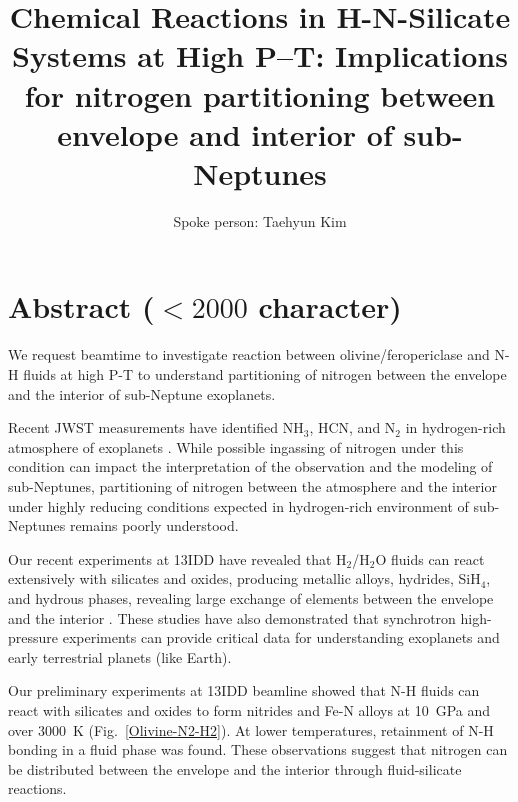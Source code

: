 
\title{Chemical Reactions in H-N-Silicate Systems at High P--T: Implications for nitrogen partitioning between envelope and interior of sub-Neptunes}
\author{Spoke person: Taehyun Kim}
\maketitle

\section{Abstract ($<2000$ character)}



We request beamtime to investigate reaction between olivine/feropericlase and N-H fluids at high P-T to understand partitioning of nitrogen between the envelope and the interior of sub-Neptune exoplanets. 

Recent JWST measurements have identified NH$_3$, HCN, and N$_2$ in hydrogen-rich atmosphere of exoplanets \cite{heng_ANALYTICAL_2016, bean_Nature_2021, radecka_Nitrogen_2025}. 
While possible ingassing of nitrogen under this condition can impact the interpretation of the observation and the modeling of sub-Neptunes, partitioning of nitrogen between the atmosphere and the interior under highly reducing conditions expected in hydrogen-rich environment of sub-Neptunes remains poorly understood. 

Our recent experiments at 13IDD have revealed that H$_2$/H$_2$O fluids can react extensively with silicates and oxides, producing metallic alloys, hydrides, SiH$_4$, and hydrous phases, revealing large exchange of elements between the envelope and the interior \cite{nisr_Large_2020, kim_Atomicscale_2021, kim_Stability_2023, horn_Building_2025}. 
These studies have also demonstrated that synchrotron high-pressure experiments can provide critical data for understanding exoplanets and early terrestrial planets (like Earth).

Our preliminary experiments at 13IDD beamline showed that N-H fluids can react with silicates and oxides to form nitrides and Fe-N alloys at 10~GPa and over 3000~K (Fig.~\ref{Olivine-N2-H2}). 
At lower temperatures, retainment of N-H bonding in a fluid phase was found. 
These observations suggest that nitrogen can be distributed between the envelope and the interior through fluid-silicate reactions. 


